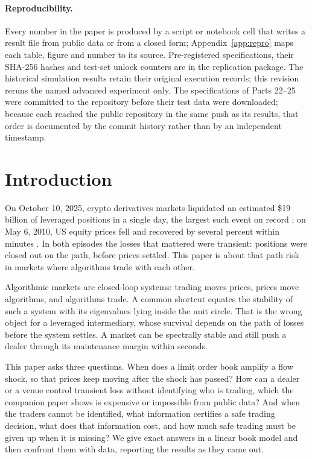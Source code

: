 \documentclass[12pt]{article}
\theoremstyle{definition}
\theoremstyle{remark}
\begin{document}
\paragraph{Reproducibility.} Every number in the paper is produced by a script or notebook cell that writes a result file from public data or from a closed form; Appendix~\ref{app:repro} maps each table, figure and number to its source. Pre-registered specifications, their SHA-256 hashes and test-set unlock counters are in the replication package. The historical simulation results retain their original execution records; this revision reruns the named advanced experiment only. The specifications of Parts 22--25 were committed to the repository before their test data were downloaded; because each reached the public repository in the same push as its results, that order is documented by the commit history rather than by an independent timestamp.

\newpage
\setcounter{page}{1}
\tableofcontents
\newpage

\section{Introduction}

On October 10, 2025, crypto derivatives markets liquidated an estimated \$19 billion of leveraged positions in a single day, the largest such event on record \citep{shares2025}; on May 6, 2010, US equity prices fell and recovered by several percent within minutes \citep{kirilenko2017}. In both episodes the losses that mattered were transient: positions were closed out on the path, before prices settled. This paper is about that path risk in markets where algorithms trade with each other.

Algorithmic markets are closed-loop systems: trading moves prices, prices move algorithms, and algorithms trade. A common shortcut equates the stability of such a system with its eigenvalues lying inside the unit circle. That is the wrong object for a leveraged intermediary, whose survival depends on the path of losses before the system settles. A market can be spectrally stable and still push a dealer through its maintenance margin within seconds.

This paper asks three questions. When does a limit order book amplify a flow shock, so that prices keep moving after the shock has passed? How can a dealer or a venue control transient loss without identifying who is trading, which the companion paper \citep{niroula2026} shows is expensive or impossible from public data? And when the traders cannot be identified, what information certifies a safe trading decision, what does that information cost, and how much safe trading must be given up when it is missing? We give exact answers in a linear book model and then confront them with data, reporting the results as they came out.
\end{document}
